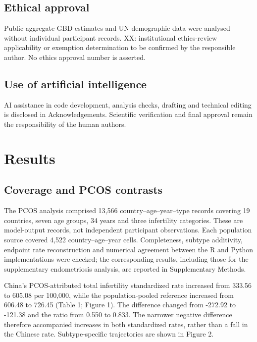 \documentclass[11pt,a4paper]{article}
\begin{document}
\subsection{Ethical approval}
Public aggregate GBD estimates and UN demographic data were analysed without individual participant records. XX: institutional ethics-review applicability or exemption determination to be confirmed by the responsible author. No ethics approval number is asserted.

\subsection{Use of artificial intelligence}
AI assistance in code development, analysis checks, drafting and technical editing is disclosed in Acknowledgements. Scientific verification and final approval remain the responsibility of the human authors.

\section{Results}
\subsection{Coverage and PCOS contrasts}
The PCOS analysis comprised 13,566 country--age--year--type records covering 19 countries, seven age groups, 34 years and three infertility categories. These are model-output records, not independent participant observations. Each population source covered 4,522 country--age--year cells. Completeness, subtype additivity, endpoint rate reconstruction and numerical agreement between the R and Python implementations were checked; the corresponding results, including those for the supplementary endometriosis analysis, are reported in Supplementary Methods.

China's PCOS-attributed total infertility standardized rate increased from 333.56 to 605.08 per 100,000, while the population-pooled reference increased from 606.48 to 726.45 (Table 1; Figure 1). The difference changed from -272.92 to -121.38 and the ratio from 0.550 to 0.833. The narrower negative difference therefore accompanied increases in both standardized rates, rather than a fall in the Chinese rate. Subtype-specific trajectories are shown in Figure 2.
\end{document}
